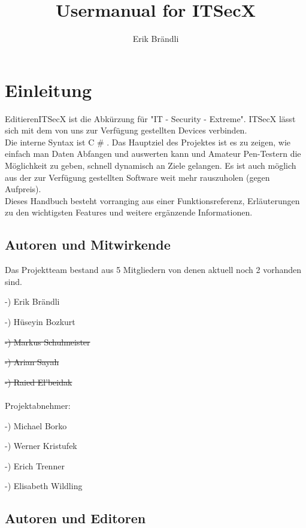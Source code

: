 \documentclass[11pt]{article} %
\title{Usermanual for ITSecX}
\author{Erik Brändli}
\begin{document}
\maketitle

\section{Einleitung}

EditierenITSecX ist die Abkürzung für "IT - Security - Extreme". ITSecX lässt sich mit dem von uns zur Verfügung gestellten Devices verbinden.\\
Die interne Syntax ist C \# . Das Hauptziel des Projektes ist es zu zeigen, wie einfach man Daten Abfangen und auswerten kann und Amateur Pen-Testern die Möglichkeit zu geben, schnell dynamisch an Ziele gelangen. Es ist auch möglich aus der zur Verfügung gestellten Software weit mehr rauszuholen (gegen Aufpreis).\\
Dieses Handbuch besteht vorranging aus einer Funktionsreferenz, Erläuterungen zu den wichtigsten Features und weitere ergänzende Informationen.


\subsection{Autoren und Mitwirkende}

Das Projektteam bestand aus 5 Mitgliedern von denen aktuell noch 2 vorhanden sind. 

-) Erik Brändli 

-) Hüseyin Bozkurt

\sout{-) Markus Schulmeister}

\sout{-) Arian Sayah} 

\sout{-) Raied El'beidak}
\\ \\
Projektabnehmer:

-) Michael Borko

-) Werner Kristufek

-) Erich Trenner

-) Elisabeth Wildling

\subsection{Autoren und Editoren}
\end{document}
